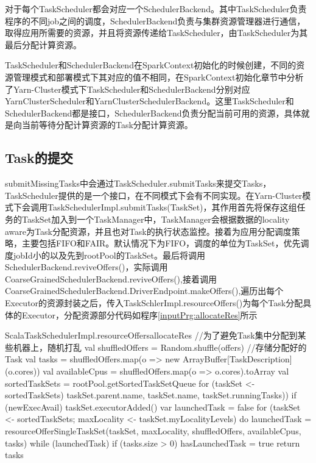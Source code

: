 对于每个TaskScheduler都会对应一个SchedulerBackend。其中TaskScheduler负责程序的不同job之间的调度，SchedulerBackend负责与集群资源管理器进行通信，取得应用所需要的资源，并且将资源传递给TaskScheduler，由TaskScheduler为其最后分配计算资源。

TaskScheduler和SchedulerBackend在SparkContext初始化的时候创建，不同的资源管理模式和部署模式下其对应的值不相同，在SparkContext初始化章节中分析了Yarn-Cluster模式下TaskScheduler和SchedulerBackend分别对应YarnClusterScheduler和YarnClusterSchedulerBackend。这里TaskScheduler和SchedulerBackend都是接口，SchedulerBackend负责分配当前可用的资源，具体就是向当前等待分配计算资源的Task分配计算资源。

\subsection{Task的提交}

submitMissingTasks中会通过TaskScheduler.submitTasks来提交Tasks，TaskScheduler提供的是一个接口，在不同模式下会有不同实现。在Yarn-Cluster模式下会调用TaskSchedulerImpl.submitTasks(TaskSet)，其作用首先将保存这组任务的TaskSet加入到一个TaskManager中，TaskManager会根据数据的locality aware为Task分配资源，并且也对Task的执行状态监控。接着为应用分配调度策略，主要包括FIFO和FAIR。默认情况下为FIFO，调度的单位为TaskSet，优先调度jobId小的以及先到rootPool的TaskSet。最后将调用SchedulerBackend.reviveOffers()，实际调用CoarseGrainedSchedulerBackend.reviveOffers(),接着调用CoarseGrainedSchedulerBackend.DriverEndpoint.makeOffers(),遍历出每个Executor的资源封装之后，传入TaskSchlerImpl.resourceOffers()为每个Task分配具体的Executor，分配资源部分代码如程序\ref{inputPrg:allocateRes}所示
\begin{codeInput}{Scala}{TaskSchedulerImpl.resourceOffers}{allocateRes}
//为了避免Task集中分配到某些机器上，随机打乱
val shuffledOffers = Random.shuffle(offers)
//存储分配好的Task
val tasks = shuffledOffers.map(o => new ArrayBuffer[TaskDescription](o.cores))
val availableCpus = shuffledOffers.map(o => o.cores).toArray
val sortedTaskSets = rootPool.getSortedTaskSetQueue
for (taskSet <- sortedTaskSets) {
  taskSet.parent.name, taskSet.name, taskSet.runningTasks))
  if (newExecAvail) {
    taskSet.executorAdded()
  }
}
var launchedTask = false
for (taskSet <- sortedTaskSets; maxLocality <- taskSet.myLocalityLevels) {
  do {
    launchedTask = resourceOfferSingleTaskSet(taskSet, maxLocality, shuffledOffers, availableCpus, tasks)
  } while (launchedTask)
}
if (tasks.size > 0) {
  hasLaunchedTask = true
}
return tasks
\end{codeInput}

